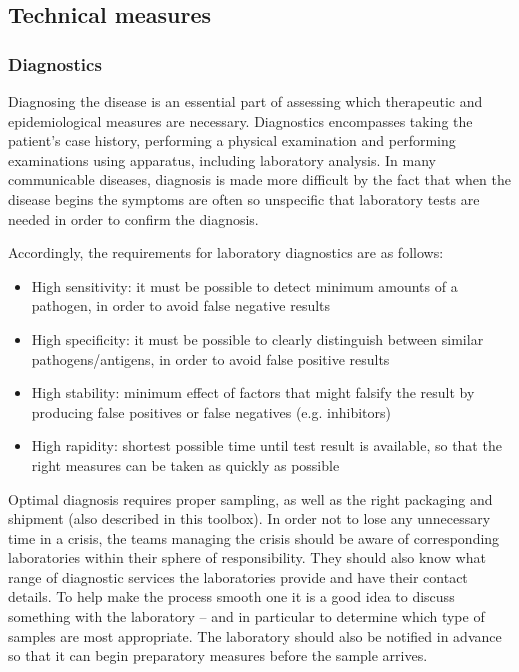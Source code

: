 \documentclass{article}
\begin{document}
\subsection{Technical measures}\label{H8998341}



\subsubsection{Diagnostics}\label{H9321297}



Diagnosing the disease is an essential part of assessing which therapeutic and epidemiological measures are necessary. Diagnostics encompasses taking the patient's case history, performing a physical examination and performing examinations using apparatus, including laboratory analysis. In many communicable diseases, diagnosis is made more difficult by the fact that when the disease begins the symptoms are often so unspecific that laboratory tests are needed in order to confirm the diagnosis.


Accordingly, the requirements for laboratory diagnostics are as follows:

\begin{itemize}
\item High sensitivity: it must be possible to detect minimum amounts of a pathogen, in order to avoid false negative results


\item High specificity: it must be possible to clearly distinguish between similar pathogens/antigens, in order to avoid false positive results


\item High stability: minimum effect of factors that might falsify the result by producing false positives or false negatives (e.g. inhibitors)


\item High rapidity: shortest possible time until test result is available, so that the right measures can be taken as quickly as possible


\end{itemize}

Optimal diagnosis requires proper sampling, as well as the right packaging and shipment (also described in this toolbox). In order not to lose any unnecessary time in a crisis, the teams managing the crisis should be aware of corresponding laboratories within their sphere of responsibility. They should also know what range of diagnostic services the laboratories provide and have their contact details. To help make the process smooth one it is a good idea to discuss something with the laboratory – and in particular to determine which type of samples are most appropriate. The laboratory should also be notified in advance so that it can begin preparatory measures before the sample arrives.
\end{document}

